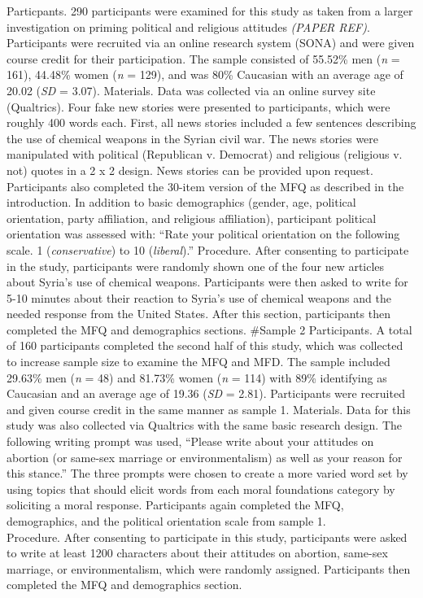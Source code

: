 \documentclass[english,man]{apa6}
\theoremstyle{definition}
\theoremstyle{definition}
\theoremstyle{definition}
\theoremstyle{remark}
\begin{document}
Particpants. 290 participants were examined for this study as taken from
a larger investigation on priming political and religious attitudes
\emph{(PAPER REF)}. Participants were recruited via an online research
system (SONA) and were given course credit for their participation. The
sample consisted of 55.52\% men (\emph{n} = 161), 44.48\% women
(\emph{n} = 129), and was 80\% Caucasian with an average age of 20.02
(\emph{SD} = 3.07). Materials. Data was collected via an online survey
site (Qualtrics). Four fake new stories were presented to participants,
which were roughly 400 words each. First, all news stories included a
few sentences describing the use of chemical weapons in the Syrian civil
war. The news stories were manipulated with political (Republican v.
Democrat) and religious (religious v. not) quotes in a 2 x 2 design.
News stories can be provided upon request. Participants also completed
the 30-item version of the MFQ as described in the introduction. In
addition to basic demographics (gender, age, political orientation,
party affiliation, and religious affiliation), participant political
orientation was assessed with: \enquote{Rate your political orientation
on the following scale. 1 (\emph{conservative}) to 10 (\emph{liberal}).}
Procedure. After consenting to participate in the study, participants
were randomly shown one of the four new articles about Syria's use of
chemical weapons. Participants were then asked to write for 5-10 minutes
about their reaction to Syria's use of chemical weapons and the needed
response from the United States. After this section, participants then
completed the MFQ and demographics sections. \#Sample 2 Participants. A
total of 160 participants completed the second half of this study, which
was collected to increase sample size to examine the MFQ and MFD. The
sample included 29.63\% men (\emph{n} = 48) and 81.73\% women (\emph{n}
= 114) with 89\% identifying as Caucasian and an average age of 19.36
(\emph{SD} = 2.81). Participants were recruited and given course credit
in the same manner as sample 1. Materials. Data for this study was also
collected via Qualtrics with the same basic research design. The
following writing prompt was used, \enquote{Please write about your
attitudes on abortion (or same-sex marriage or environmentalism) as well
as your reason for this stance.} The three prompts were chosen to create
a more varied word set by using topics that should elicit words from
each moral foundations category by soliciting a moral response.
Participants again completed the MFQ, demographics, and the political
orientation scale from sample 1.\\
Procedure. After consenting to participate in this study, participants
were asked to write at least 1200 characters about their attitudes on
abortion, same-sex marriage, or environmentalism, which were randomly
assigned. Participants then completed the MFQ and demographics section.
\end{document}
